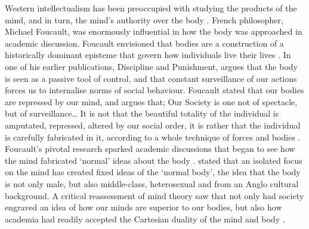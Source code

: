 	Western intellectualism has been preoccupied with studying the products of the mind, and in turn, the mind’s authority over the body \parencites{Butler_1990}{Shilling_1993}{Shilling_2008}. French philosopher, Michael Foucault, was enormously influential in how the body was approached in academic discussion. Foucault envisioned that bodies are a construction of a historically dominant episteme that govern how individuals live their lives \parencites{Boric_2008}{Foucault_1977} . In one of his earlier publications, Discipline and Punishment, \textcite{Foucault_1977}  argues that the body is seen as a passive tool of control, and that constant surveillance of our actions forces us to internalise norms of social behaviour. Foucault stated that our bodies are repressed by our mind, and argues that;
	Our Society is one not of spectacle, but of surveillance… It is not that the beautiful totality of the individual is amputated, repressed, altered by our social order, it is rather that the individual is carefully fabricated in it, according to a whole technique of forces and bodies \parencite [217] {Foucault_1977}.
	Foucault’s pivotal research sparked academic discussions that began to see how the mind fabricated ‘normal’ ideas about the body \parencite{Meskell_1996, Wylie_1992}. \textcite[6]{Cranny-Francis_1995} stated that an isolated focus on the mind has created fixed ideas of the ‘normal body’, the idea that the body is not only male, but also middle-class, heterosexual and from an Anglo cultural background. A critical reassessment of mind theory saw that not only had society engraved an idea of how our minds are superior to our bodies, but also how academia had readily accepted the Cartesian duality of the mind and body \parencites {Meskell_1998}{Yates_1993}.

